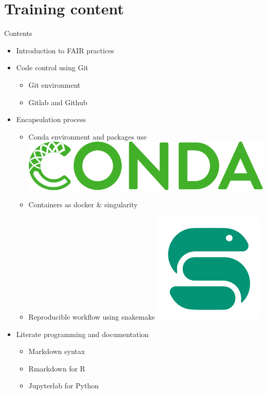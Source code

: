 \section{Training content}
\begin{frame}
\begin{block}{Contents}
\begin{itemize}
\item<1-> Introduction to FAIR practices
\item<2-> Code control using Git \faGit* 
	\begin{itemize}[<2->]
	\item Git environment
	\item Gitlab and Github \faGithub \faGitlab
	\end{itemize}
\item<3-> Encapsulation process
	\begin{itemize}[<3->]
	\item Conda environment and packages use \includegraphics[scale=0.07]{images/conda_logo.pdf}
	\item Containers as docker \& singularity \faDocker 
	\item Reproducible workflow using snakemake 	\includegraphics[scale=0.05]{images/snakemake_logo.png}
	\end{itemize}
\item<4-> Literate programming and documentation
	\begin{itemize}[<4->]
	\item Markdown syntax \faMarkdown
	\item Rmarkdown for R \faRProject 
	\item Jupyterlab for Python \faPython
	\end{itemize}
\end{itemize}
\end{block}

\end{frame}

